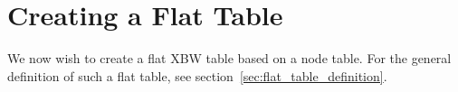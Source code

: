 \documentclass[a4paper,12pt,twoside,BCOR=10mm]{scrbook}
\begin{document}
%
%

\section{Creating a Flat Table}
%

We now wish to create a flat XBW table based on a node table. 
For the general definition of such a flat table, see section~\ref{sec:flat_table_definition}.
\end{document}
